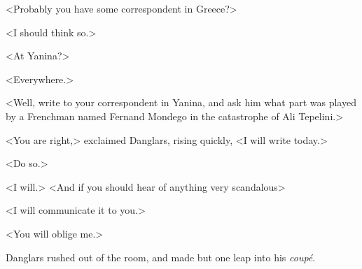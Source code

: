  <Probably you have some correspondent in Greece?> 

 <I should think so.> 

 <At Yanina?> 

 <Everywhere.> 

 <Well, write to your correspondent in Yanina, and ask him what part was played by a Frenchman named Fernand Mondego in the catastrophe of Ali Tepelini.> 

 <You are right,> exclaimed Danglars, rising quickly, <I will write today.> 

 <Do so.> 

 <I will.>  <And if you should hear of anything very scandalous\longdash> 

 <I will communicate it to you.> 

 <You will oblige me.> 

 Danglars rushed out of the room, and made but one leap into his \textit{coupé}. 